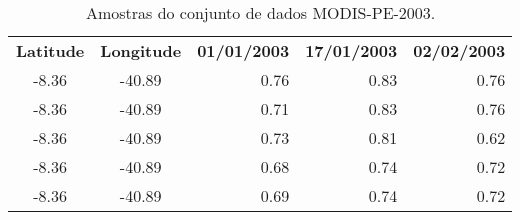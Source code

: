 \begin{table}[htbp]
\centering
\begin{tabular}{|c|c|r|r|r|}
  \hline
	\textbf{Latitude} & \textbf{Longitude} & \textbf{01/01/2003} & \textbf{17/01/2003} & \textbf{02/02/2003} \\ 
  \hhline{|=|=|=|=|=|}
	-8.36 & -40.89 & 0.76 & 0.83 & 0.76 \\ \hline
  -8.36 & -40.89 & 0.71 & 0.83 & 0.76 \\ \hline
  -8.36 & -40.89 & 0.73 & 0.81 & 0.62 \\ \hline
  -8.36 & -40.89 & 0.68 & 0.74 & 0.72 \\ \hline
  -8.36 & -40.89 & 0.69 & 0.74 & 0.72 \\
	\hline
\end{tabular}
\caption{Amostras do conjunto de dados MODIS-PE-2003.} 
\label{tab:amostra_dados}
\end{table}
